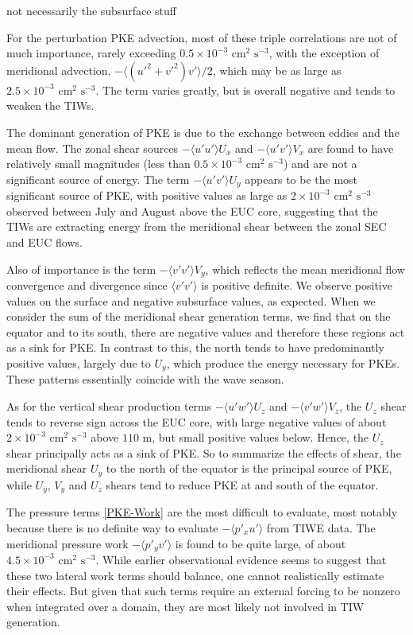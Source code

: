 \documentclass[letterpaper, 11pt, onecolumn]{article}
\newcommand{\energy}[1]{$#1 \times 10^{-3} \text{ cm}^2 \text{ s}^{-3}$}
\begin{document}
not necessarily the subsurface stuff

For the perturbation PKE advection, most of these triple correlations are not
of much importance, rarely exceeding \energy{0.5}, with the exception of
meridional advection, $-\langle \left(u'^2 + v'^2\right) v' \rangle / 2$, which
may be as large as \energy{2.5}. The term varies greatly, but is overall
negative and tends to weaken the TIWs.

The dominant generation of PKE is due to the exchange between eddies and the
mean flow. The zonal shear sources $-\langle u' u' \rangle U_x$ and $-\langle
u' v' \rangle V_x$ are found to have relatively small magnitudes (less than
\energy{0.5}) and are not a significant source of energy. The term $-\langle u'
v' \rangle U_y$ appears to be the most significant source of PKE, with positive
values as large as \energy{2} observed between July and August above the EUC
core, suggesting that the TIWs are extracting energy from the meridional shear
between the zonal SEC and EUC flows.

Also of importance is the term $-\langle v' v' \rangle V_y$, which reflects the
mean meridional flow convergence and divergence since $\langle v' v' \rangle$
is positive definite. We observe positive values on the surface and negative
subsurface values, as expected. When we consider the sum of the meridional
shear generation terms, we find that on the equator and to its south, there are
negative values and therefore these regions act as a sink for PKE. In contrast
to this, the north tends to have predominantly positive values, largely due to
$U_y$, which produce the energy necessary for PKEs. These patterns essentially
coincide with the wave season.

As for the vertical shear production terms $-\langle u' w' \rangle U_z$ and
$-\langle v' w' \rangle V_z$, the $U_z$ shear tends to reverse sign across the
EUC core, with large negative values of about \energy{2} above $110 \text{ m}$,
but small positive values below. Hence, the $U_z$ shear principally acts as a
sink of PKE. So to summarize the effects of shear, the meridional shear $U_y$
to the north of the equator is the principal source of PKE, while $U_y$, $V_y$
and $U_z$ shears tend to reduce PKE at and south of the equator.

The pressure terms \eqref{PKE-Work} are the most difficult to evaluate, most
notably because there is no definite way to evaluate $-\langle p'_x u' \rangle$
from TIWE data. The meridional pressure work $-\langle p'_y v' \rangle$ is
found to be quite large, of about \energy{4.5}. While earlier observational
evidence seems to suggest that these two lateral work terms should balance, one
cannot realistically estimate their effects. But given that such terms require
an external forcing to be nonzero when integrated over a domain, they are most
likely not involved in TIW generation.
\end{document}
